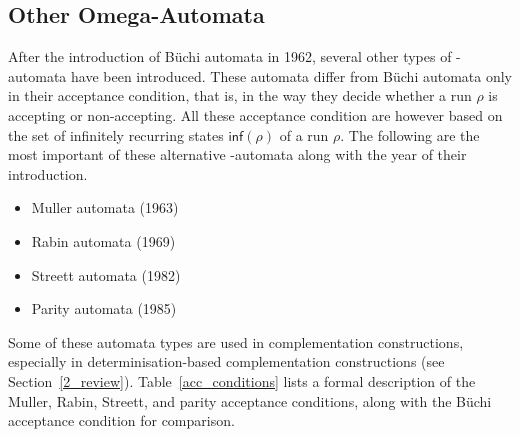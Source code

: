 

\subsection{Other Omega-Automata}
\label{2_om-automata}
After the introduction of Büchi automata in 1962, several other types of \om-automata have been introduced. These automata differ from Büchi automata only in their acceptance condition, that is, in the way they decide whether a run $\rho$ is accepting or non-accepting. All these acceptance condition are however based on the set of infinitely recurring states $\textsf{inf}(\rho)$ of a run $\rho$. The following are the most important of these alternative \om-automata along with the year of their introduction.

\begin{itemize}
\item Muller automata (1963)~\cite{1963_muller}
\item Rabin automata (1969)~\cite{rabin1969decidability}
\item Streett automata (1982)~\cite{Streett1982121}
\item Parity automata (1985)~\cite{1985_mostowski}
\end{itemize}

Some of these automata types are used in complementation constructions, especially in determinisation-based complementation constructions (see Section~\ref{2_review}). Table~\ref{acc_conditions} lists a formal description of the Muller, Rabin, Streett, and parity acceptance conditions, along with the Büchi acceptance condition for comparison.


